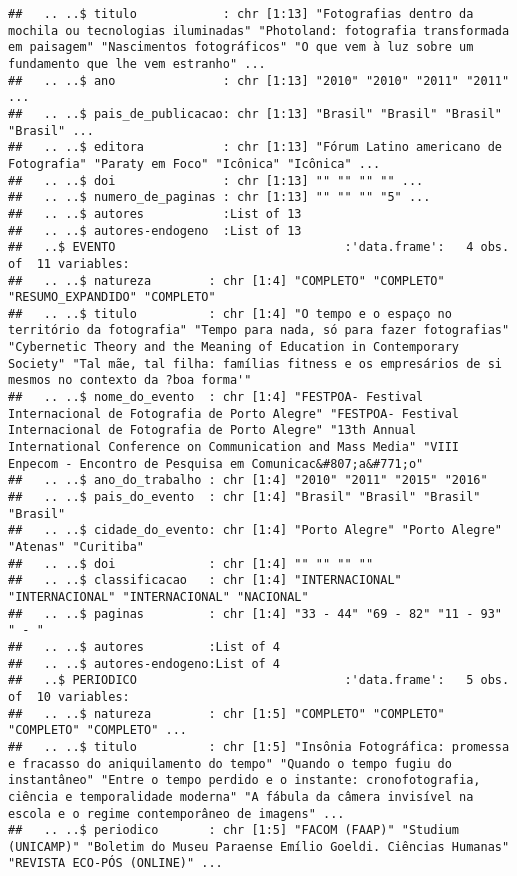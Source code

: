 \documentclass[]{article}
\begin{document}
\begin{verbatim}
##   .. ..$ titulo            : chr [1:13] "Fotografias dentro da mochila ou tecnologias iluminadas" "Photoland: fotografia transformada em paisagem" "Nascimentos fotográficos" "O que vem à luz sobre um fundamento que lhe vem estranho" ...
##   .. ..$ ano               : chr [1:13] "2010" "2010" "2011" "2011" ...
##   .. ..$ pais_de_publicacao: chr [1:13] "Brasil" "Brasil" "Brasil" "Brasil" ...
##   .. ..$ editora           : chr [1:13] "Fórum Latino americano de Fotografia" "Paraty em Foco" "Icônica" "Icônica" ...
##   .. ..$ doi               : chr [1:13] "" "" "" "" ...
##   .. ..$ numero_de_paginas : chr [1:13] "" "" "" "5" ...
##   .. ..$ autores           :List of 13
##   .. ..$ autores-endogeno  :List of 13
##   ..$ EVENTO                                :'data.frame':   4 obs. of  11 variables:
##   .. ..$ natureza        : chr [1:4] "COMPLETO" "COMPLETO" "RESUMO_EXPANDIDO" "COMPLETO"
##   .. ..$ titulo          : chr [1:4] "O tempo e o espaço no território da fotografia" "Tempo para nada, só para fazer fotografias" "Cybernetic Theory and the Meaning of Education in Contemporary Society" "Tal mãe, tal filha: famílias fitness e os empresários de si mesmos no contexto da ?boa forma'"
##   .. ..$ nome_do_evento  : chr [1:4] "FESTPOA- Festival Internacional de Fotografia de Porto Alegre" "FESTPOA- Festival Internacional de Fotografia de Porto Alegre" "13th Annual International Conference on Communication and Mass Media" "VIII Enpecom - Encontro de Pesquisa em Comunicac&#807;a&#771;o"
##   .. ..$ ano_do_trabalho : chr [1:4] "2010" "2011" "2015" "2016"
##   .. ..$ pais_do_evento  : chr [1:4] "Brasil" "Brasil" "Brasil" "Brasil"
##   .. ..$ cidade_do_evento: chr [1:4] "Porto Alegre" "Porto Alegre" "Atenas" "Curitiba"
##   .. ..$ doi             : chr [1:4] "" "" "" ""
##   .. ..$ classificacao   : chr [1:4] "INTERNACIONAL" "INTERNACIONAL" "INTERNACIONAL" "NACIONAL"
##   .. ..$ paginas         : chr [1:4] "33 - 44" "69 - 82" "11 - 93" " - "
##   .. ..$ autores         :List of 4
##   .. ..$ autores-endogeno:List of 4
##   ..$ PERIODICO                             :'data.frame':   5 obs. of  10 variables:
##   .. ..$ natureza        : chr [1:5] "COMPLETO" "COMPLETO" "COMPLETO" "COMPLETO" ...
##   .. ..$ titulo          : chr [1:5] "Insônia Fotográfica: promessa e fracasso do aniquilamento do tempo" "Quando o tempo fugiu do instantâneo" "Entre o tempo perdido e o instante: cronofotografia, ciência e temporalidade moderna" "A fábula da câmera invisível na escola e o regime contemporâneo de imagens" ...
##   .. ..$ periodico       : chr [1:5] "FACOM (FAAP)" "Studium (UNICAMP)" "Boletim do Museu Paraense Emílio Goeldi. Ciências Humanas" "REVISTA ECO-PÓS (ONLINE)" ...

\end{verbatim}
\end{document}
